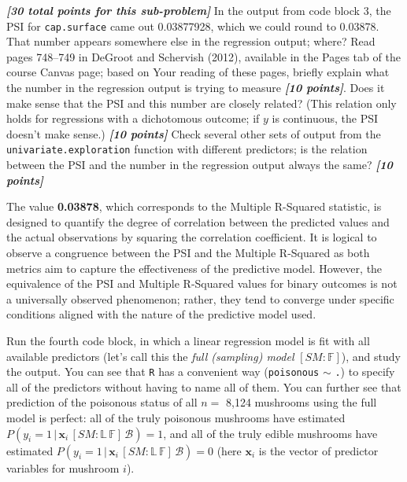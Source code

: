 \documentclass[12pt]{article}
\newcommand{\given}{\, | \,}
\newcommand{\bi}[1]{\b{\i{#1}}}
\renewcommand{\b}[1]{\textbf{#1}}
\renewcommand{\i}[1]{\textit{#1}}
\begin{document}
\begin{itemize}
\bi{[30 total points for this sub-problem]} In the output from code block 3, the PSI for \texttt{cap.surface} came out 0.03877928, which we could round to 0.03878. That number appears somewhere else in the regression output; where? Read pages 748--749 in DeGroot and Schervish (2012), available in the Pages tab of the course Canvas page; based on Your reading of these pages, briefly explain what the number in the regression output is trying to measure \bi{[10 points]}. Does it make sense that the PSI and this number are closely related? (This relation only holds for regressions with a dichotomous outcome; if $y$ is continuous, the PSI doesn't make sense.) \bi{[10 points]} Check several other sets of output from the \texttt{univariate.exploration} function with different predictors; is the relation between the PSI and the number in the regression output always the same? \bi{[10 points]}

{\color{blue}
The value \textbf{0.03878}, which corresponds to the Multiple R-Squared statistic, is designed to quantify the degree of correlation between the predicted values and the actual observations by squaring the correlation coefficient. It is logical to observe a congruence between the PSI and the Multiple R-Squared as both metrics aim to capture the effectiveness of the predictive model. However, the equivalence of the PSI and Multiple R-Squared values for binary outcomes is not a universally observed phenomenon; rather, they tend to converge under specific conditions aligned with the nature of the predictive model used.
}
\end{itemize}

Run the fourth code block, in which a linear regression model is fit with all available predictors (let's call this the \textit{full (sampling) model} $[ SM \! \! : \! \mathbb{ F } ]$), and study the output. You can see that \texttt{R} has a convenient way (\texttt{poisonous} $\sim$ \texttt{.}) to specify all of the predictors without having to name all of them. You can further see that prediction of the poisonous status of all $n =$ 8,124 mushrooms using the full model is perfect: all of the truly poisonous mushrooms have estimated $P ( y_i = 1 \given \bm{ x }_i \, [ SM \! \! : \! \mathbb{ L } \, \mathbb{ F } ] \, \mathcal{ B } ) = 1$, and all of the truly edible mushrooms have estimated $P ( y_i = 1 \given \bm{ x }_i \, [ SM \! \! : \! \mathbb{ L } \, \mathbb{ F } ] \, \mathcal{ B } ) = 0$ (here $\bm{ x }_i$ is the vector of predictor variables for mushroom $i$). 
\end{document}
